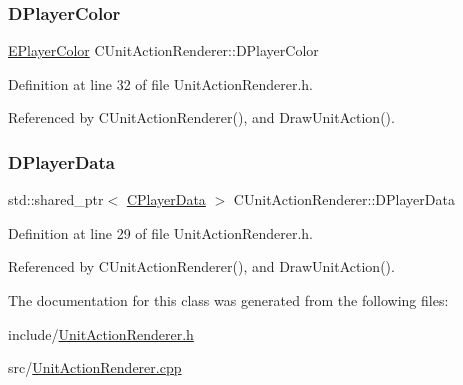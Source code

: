 \subsubsection{\texorpdfstring{D\+Player\+Color}{DPlayerColor}}
{\footnotesize\ttfamily \hyperlink{GameDataTypes_8h_aafb0ca75933357ff28a6d7efbdd7602f}{E\+Player\+Color} C\+Unit\+Action\+Renderer\+::\+D\+Player\+Color\hspace{0.3cm}{\ttfamily [protected]}}



Definition at line 32 of file Unit\+Action\+Renderer.\+h.



Referenced by C\+Unit\+Action\+Renderer(), and Draw\+Unit\+Action().

\hypertarget{classCUnitActionRenderer_a77f8e3045992a48b27ad6e45d48a7b91}{}\label{classCUnitActionRenderer_a77f8e3045992a48b27ad6e45d48a7b91} 
\subsubsection{\texorpdfstring{D\+Player\+Data}{DPlayerData}}
{\footnotesize\ttfamily std\+::shared\+\_\+ptr$<$ \hyperlink{classCPlayerData}{C\+Player\+Data} $>$ C\+Unit\+Action\+Renderer\+::\+D\+Player\+Data\hspace{0.3cm}{\ttfamily [protected]}}



Definition at line 29 of file Unit\+Action\+Renderer.\+h.



Referenced by C\+Unit\+Action\+Renderer(), and Draw\+Unit\+Action().



The documentation for this class was generated from the following files\+:\begin{DoxyCompactItemize}
\item 
include/\hyperlink{UnitActionRenderer_8h}{Unit\+Action\+Renderer.\+h}\item 
src/\hyperlink{UnitActionRenderer_8cpp}{Unit\+Action\+Renderer.\+cpp}\end{DoxyCompactItemize}
